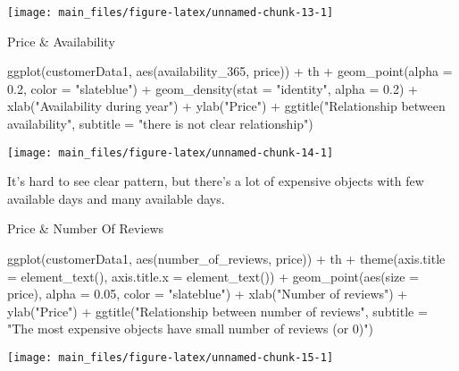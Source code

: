\begin{Schunk}


\begin{center}\texttt{[image: main\_files/figure-latex/unnamed-chunk-13-1]} \end{center}

\end{Schunk}

Price \& Availability

\begin{Schunk}
\begin{Sinput}
ggplot(customerData1, aes(availability_365, price)) +
  th +
  geom_point(alpha = 0.2, color = "slateblue") +
  geom_density(stat = "identity", alpha = 0.2) +
  xlab("Availability during year") +
  ylab("Price") +
  ggtitle("Relationship between availability",
          subtitle = "there is not clear relationship") 
\end{Sinput}


\begin{center}\texttt{[image: main\_files/figure-latex/unnamed-chunk-14-1]} \end{center}

\end{Schunk}

It's hard to see clear pattern, but there's a lot of expensive objects
with few available days and many available days.

Price \& Number Of Reviews

\begin{Schunk}
\begin{Sinput}
ggplot(customerData1, aes(number_of_reviews, price)) +
  th + theme(axis.title = element_text(), axis.title.x = element_text()) +
  geom_point(aes(size = price), alpha = 0.05, color = "slateblue") +
  xlab("Number of reviews") +
  ylab("Price") +
  ggtitle("Relationship between number of reviews",
          subtitle = "The most expensive objects have small number of reviews (or 0)")
\end{Sinput}


\begin{center}\texttt{[image: main\_files/figure-latex/unnamed-chunk-15-1]} \end{center}

\end{Schunk}

